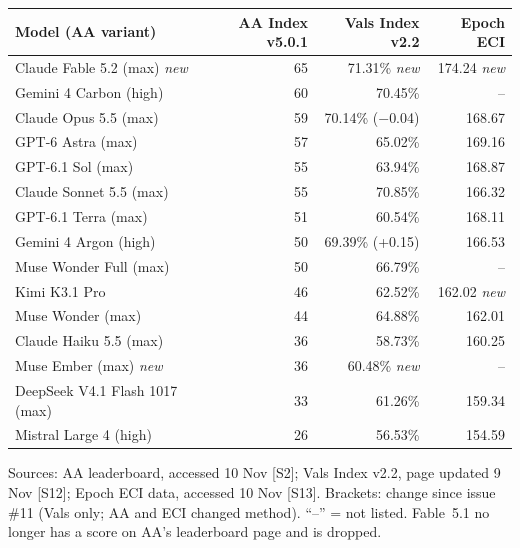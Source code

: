 \documentclass[11pt,a4paper]{article}
\newcommand{\srcref}[1]{\textcolor{brandaccent}{[S#1]}}
\begin{document}
{\small
\begin{tabularx}{\textwidth}{@{}X r r r@{}}
\toprule
\textbf{Model (AA variant)} & \textbf{AA Index v5.0.1} & \textbf{Vals Index v2.2} & \textbf{Epoch ECI} \\
\midrule
Claude Fable 5.2 (max) \emph{new}  & 65 & 71.31\% \emph{new} & 174.24 \emph{new} \\
Gemini 4 Carbon (high)             & 60 & 70.45\%            & -- \\
Claude Opus 5.5 (max)              & 59 & 70.14\% ($-$0.04)  & 168.67 \\
GPT-6 Astra (max)                  & 57 & 65.02\%            & 169.16 \\
GPT-6.1 Sol (max)                  & 55 & 63.94\%            & 168.87 \\
Claude Sonnet 5.5 (max)            & 55 & 70.85\%            & 166.32 \\
GPT-6.1 Terra (max)                & 51 & 60.54\%            & 168.11 \\
Gemini 4 Argon (high)              & 50 & 69.39\% (+0.15)    & 166.53 \\
Muse Wonder Full (max)             & 50 & 66.79\%            & -- \\
Kimi K3.1 Pro                      & 46 & 62.52\%            & 162.02 \emph{new} \\
Muse Wonder (max)                  & 44 & 64.88\%            & 162.01 \\
Claude Haiku 5.5 (max)             & 36 & 58.73\%            & 160.25 \\
Muse Ember (max) \emph{new}        & 36 & 60.48\% \emph{new} & -- \\
DeepSeek V4.1 Flash 1017 (max)     & 33 & 61.26\%            & 159.34 \\
Mistral Large 4 (high)             & 26 & 56.53\%            & 154.59 \\
\bottomrule
\end{tabularx}}
\par\vspace{0.2em}
{\footnotesize\color{brandgrey}Sources: AA leaderboard, accessed 10 Nov \srcref{2}; Vals Index v2.2, page updated 9 Nov \srcref{12};
Epoch ECI data, accessed 10 Nov \srcref{13}. Brackets: change since issue \#11 (Vals only; AA and ECI changed method). ``--'' = not listed. Fable~5.1 no longer has a score on AA's leaderboard page and is dropped.}
\vspace{0.3em}

\end{document}
